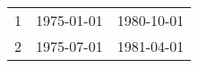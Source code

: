 % 
\begin{tabular}{ccc}
  \hline
  \hline
1 & 1975-01-01 & 1980-10-01 \\ 
  2 & 1975-07-01 & 1981-04-01 \\ 
   \hline
\end{tabular}

